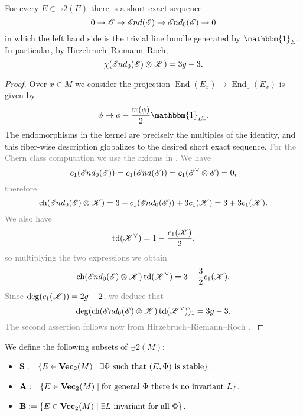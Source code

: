 \documentclass[A4paper, 12pt, british, reqno]{amsart}
\DeclareMathOperator{\End}{End}
\DeclareMathOperator{\tr}{tr}
\DeclareMathOperator{\ch}{ch}
\DeclareMathOperator{\td}{td}
\newcommand{\ot}{\otimes}
\newcommand{\dual}{^{\vee}}
\newcommand{\1}{\mathbbm{1}}
\begin{document}
\begin{lm}\label{lm:traceless}
    For every $E\in \Vec_{2}(E)$ there is a short exact sequence
    \[ 0\to \mathscr{O}\to \mathscr{E}\hspace{-0.2mm} nd(\mathscr{E})\to \mathscr{E}\hspace{-0.2mm} nd_{0}(\mathscr{E})\to 0 \]
    in which the left hand side is the trivial line bundle generated by $\1_{E}$.
    In particular, by Hirzebruch--Riemann--Roch,
    \[ \chi(\sEnd_{0}(\E)\ot \sK)=3g-3. \]
    \begin{proof}
	Over $x\in M$ we consider the projection $\End(E_{x})\to \End_{0}(E_{x})$ is given by
	\[ \phi\mapsto \phi-\frac{\tr(\phi)}{2}\1_{E_{x}}. \]
	The endomorphisms in the kernel are precisely the multiples of the identity, and this fiber-wise description globalizes to the desired short exact sequence.	
	\textcolor{gray}{%
	For the Chern class computation we use the axioms in \cite[Appendix A]{har77}.
	We have
	\[ c_{1}(\sEnd_{0}(\E))=c_{1}(\sEnd(\E))=c_{1}(\E\dual\ot\E)=0, \]
	therefore
	\[ \ch(\sEnd_{0}(\E)\ot \sK)=3+c_{1}(\sEnd_{0}(\E))+3c_{1}(\sK)=3+3c_{1}(\sK). \]
	We also have
	\[ \td(\sK\dual)=1-\frac{c_{1}(\sK)}{2}, \]
	so multiplying the two expressions we obtain
	\[ \ch(\sEnd_{0}(\E)\ot \sK)\td(\sK\dual)=3+\frac{3}{2}c_{1}(\sK). \]
	Since $\deg(c_{1}(\mathscr{K}))=2g-2$, we deduce that
	\[ \deg(\ch(\sEnd_{0}(\E)\ot\sK)\td(\sK\dual))_{1}=3g-3. \]
	The second assertion follows now from Hirzebruch--Riemann--Roch \cite[Theorem A.4.1]{har77}.
	}
    \end{proof}
\end{lm}

\begin{unota}
    We define the following subsets of $\Vec_{2}(M)$:
    \begin{itemize}
	\item $\mathbf{S}:=\{ E\in \mathbf{Vec}_{2}(M)\mid \exists \Phi \text{ such that }(E,\Phi)\text{ is stable}\}$.
	\item $\mathbf{A}:=\{ E\in \mathbf{Vec}_{2}(M)\mid \text{for general }\Phi\text{ there is no invariant }L \}$.
	\item $\mathbf{B}:=\{ E\in \mathbf{Vec}_{2}(M)\mid \exists L\text{ invariant for all }\Phi\}$.
    \end{itemize}
\end{unota}
\end{document}
